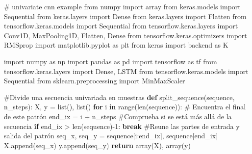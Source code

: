 \documentclass[
  us-letterpaper,
]{scrreprt}
\newenvironment{Shaded}{\begin{snugshade}}{\end{snugshade}}
\newcommand{\BuiltInTok}[1]{\textcolor[rgb]{0.00,0.23,0.31}{#1}}
\newcommand{\CommentTok}[1]{\textcolor[rgb]{0.37,0.37,0.37}{#1}}
\newcommand{\ControlFlowTok}[1]{\textcolor[rgb]{0.00,0.23,0.31}{\textbf{#1}}}
\newcommand{\DecValTok}[1]{\textcolor[rgb]{0.68,0.00,0.00}{#1}}
\newcommand{\ImportTok}[1]{\textcolor[rgb]{0.00,0.46,0.62}{#1}}
\newcommand{\KeywordTok}[1]{\textcolor[rgb]{0.00,0.23,0.31}{\textbf{#1}}}
\newcommand{\NormalTok}[1]{\textcolor[rgb]{0.00,0.23,0.31}{#1}}
\newcommand{\OperatorTok}[1]{\textcolor[rgb]{0.37,0.37,0.37}{#1}}
\theoremstyle{plain}
\theoremstyle{definition}
\theoremstyle{definition}
\theoremstyle{remark}
\begin{document}
\begin{Shaded}
\begin{Highlighting}[]
\CommentTok{\# univariate cnn example}
\ImportTok{from}\NormalTok{ numpy }\ImportTok{import}\NormalTok{ array}
\ImportTok{from}\NormalTok{ keras.models }\ImportTok{import}\NormalTok{ Sequential}
\ImportTok{from}\NormalTok{ keras.layers }\ImportTok{import}\NormalTok{ Dense}
\ImportTok{from}\NormalTok{ keras.layers }\ImportTok{import}\NormalTok{ Flatten}
\ImportTok{from}\NormalTok{ tensorflow.keras.models }\ImportTok{import}\NormalTok{ Sequential}
\ImportTok{from}\NormalTok{ tensorflow.keras.layers }\ImportTok{import}\NormalTok{ Conv1D, MaxPooling1D, Flatten, Dense}
\ImportTok{from}\NormalTok{ tensorflow.keras.optimizers }\ImportTok{import}\NormalTok{ RMSprop}
\ImportTok{import}\NormalTok{ matplotlib.pyplot }\ImportTok{as}\NormalTok{ plt}
\ImportTok{from}\NormalTok{ keras }\ImportTok{import}\NormalTok{ backend }\ImportTok{as}\NormalTok{ K}

\ImportTok{import}\NormalTok{ numpy }\ImportTok{as}\NormalTok{ np}
\ImportTok{import}\NormalTok{ pandas }\ImportTok{as}\NormalTok{ pd}
\ImportTok{import}\NormalTok{ tensorflow }\ImportTok{as}\NormalTok{ tf}
\ImportTok{from}\NormalTok{ tensorflow.keras.layers }\ImportTok{import}\NormalTok{ Dense, LSTM}
\ImportTok{from}\NormalTok{ tensorflow.keras.models }\ImportTok{import}\NormalTok{ Sequential}
\ImportTok{from}\NormalTok{ sklearn.preprocessing }\ImportTok{import}\NormalTok{ MinMaxScaler    }


\CommentTok{\#Divide una secuencia univariada en muestras}
\KeywordTok{def}\NormalTok{ split\_sequence(sequence, n\_steps):}
\NormalTok{    X, y }\OperatorTok{=} \BuiltInTok{list}\NormalTok{(), }\BuiltInTok{list}\NormalTok{()}
    \ControlFlowTok{for}\NormalTok{ i }\KeywordTok{in} \BuiltInTok{range}\NormalTok{(}\BuiltInTok{len}\NormalTok{(sequence)):}
        \CommentTok{\# Encuentra el final de este patrón}
\NormalTok{        end\_ix }\OperatorTok{=}\NormalTok{ i }\OperatorTok{+}\NormalTok{ n\_steps}
        \CommentTok{\#Comprueba si se está más allá de la secuencia}
        \ControlFlowTok{if}\NormalTok{ end\_ix }\OperatorTok{\textgreater{}} \BuiltInTok{len}\NormalTok{(sequence)}\OperatorTok{{-}}\DecValTok{1}\NormalTok{:}
            \ControlFlowTok{break}
        \CommentTok{\#Reune las partes de entrada y salida del patrón}
\NormalTok{        seq\_x, seq\_y }\OperatorTok{=}\NormalTok{ sequence[i:end\_ix], sequence[end\_ix]}
\NormalTok{        X.append(seq\_x)}
\NormalTok{        y.append(seq\_y)}
    \ControlFlowTok{return}\NormalTok{ array(X), array(y)}


\end{Highlighting}
\end{Shaded}
\end{document}

